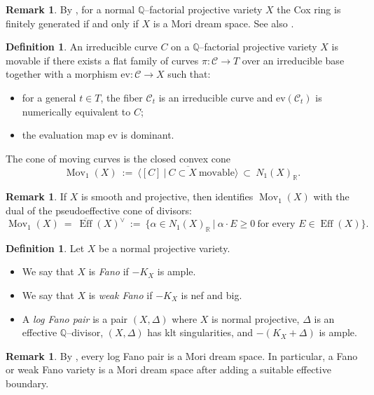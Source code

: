 \documentclass[10pt]{amsart}
\theoremstyle{definition}
\newtheorem{definition}[theorem]{Definition}
\newtheorem{remark}[theorem]{Remark}
\newcommand{\Q}{\mathbb{Q}}
\newcommand{\R}{\mathbb{R}}
\newcommand{\Eff}{\operatorname{Eff}}
\newcommand{\Mov}{\operatorname{Mov}}
\theoremstyle{plain} %
\begin{document}
\begin{remark}\label{dimCox}
By \cite[Proposition~2.9]{HK00}, for a normal $\Q$--factorial projective variety $X$ the Cox ring is finitely generated
if and only if $X$ is a Mori dream space. See also \cite[Section~1.3]{ADHL15}.
\end{remark}


\begin{definition}\label{def:movable-curve}
An irreducible curve $C$ on a $\Q$--factorial projective variety $X$ is movable
if there exists a flat family of curves
$\pi\colon \mathscr C\to T$ over an irreducible base together with a morphism
$\mathrm{ev}\colon \mathscr C\to X$ such that:
\begin{itemize}
\item[-] for a general $t\in T$, the fiber $\mathscr C_t$ is an irreducible curve
and $\mathrm{ev}(\mathscr C_t)$ is numerically equivalent to $C$;
\item[-] the evaluation map $\mathrm{ev}$ is dominant.
\end{itemize}
The cone of moving curves is the closed convex cone
\[
\Mov_1(X)\ :=\ \overline{\bigl\langle [C]\ \big|\ C\subset X\ \text{movable}\bigr\rangle}
\ \subset\ N_1(X)_\R.
\]
\end{definition}


\begin{remark}\label{rem:bdpp}
If $X$ is smooth and projective, then \cite[Theorem~2.2]{BDPP13} identifies
$\Mov_1(X)$ with the dual of the pseudoeffective cone of divisors:
\[
\Mov_1(X)\ =\ \overline{\Eff}(X)^\vee
\ :=\ \bigl\{\alpha\in N_1(X)_\R\ \big|\ \alpha\cdot E\ge 0\ \text{for every }E\in \Eff(X)\bigr\}.
\]
\end{remark}


\begin{definition}
Let $X$ be a normal projective variety.
\begin{itemize}
  \item[(i)] We say that $X$ is \emph{Fano} if $-K_X$ is ample.
  \item[(ii)] We say that $X$ is \emph{weak Fano} if $-K_X$ is nef and big.
  \item[(iii)] A \emph{log Fano pair} is a pair $(X,\Delta)$ where $X$ is normal projective, $\Delta$ is an effective $\Q$--divisor,
  $(X,\Delta)$ has klt singularities, and $-(K_X+\Delta)$ is ample.
\end{itemize}
\end{definition}

\begin{remark}\label{Fano-logFano-MDS}
By \cite[Corollary~1.3.2]{BCHM10}, every log Fano pair is a Mori dream space.
In particular, a Fano or weak Fano variety is a Mori dream space after adding a suitable effective boundary.
\end{remark}
\end{document}
